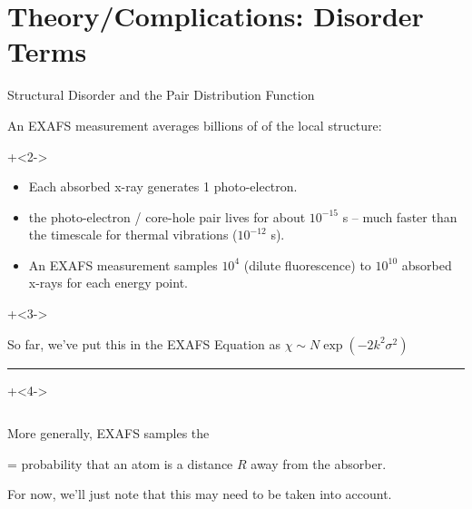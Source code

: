 
\section{Theory/Complications: Disorder Terms}

\begin{slide}{Structural Disorder and the Pair Distribution Function}


  \begin{cenpage}{120mm}

    
  An EXAFS measurement averages billions of {} of the
  local structure:

  \onslide+<2->
  
    \begin{itemize}
    \item Each absorbed x-ray generates 1 photo-electron.
    \item the photo-electron / core-hole pair lives for about
      $10^{-15}$ s --  much faster than the timescale for thermal vibrations ($10^{-12}$ s).
    \item An EXAFS measurement samples $10^4$ (dilute fluorescence) to $10^{10}$
      absorbed x-rays for each energy point.
    \end{itemize}
  
  \vmm \onslide+<3->
  \vmm
  
  So far, we've put this in the EXAFS Equation as \hspace{2mm}
  $\chi \sim N \exp({-2k^2\sigma^2}) $
  
  \vmm \hrule \vmm \onslide+<4->
  
  \begin{columns}
  \begin{column}{50mm}
    More generally, EXAFS samples the
    
    \vmm
    {}
    
    \vmm
    
    {} =   probability that an
    atom is a distance $R$ away from the absorber.
    
    \vmm\vmm

    For now, we'll just note that this may need to be taken into account.
    
    
  \end{column}
  \begin{column}{70mm}
    
  \end{column}
\end{columns}

\end{cenpage}

\end{slide}


